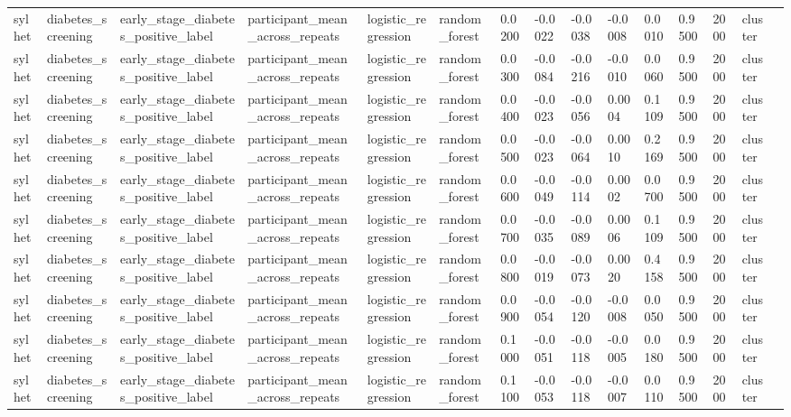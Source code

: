 \begin{tabular}{lllllllllllllll}
sylhet & diabetes\_screening & early\_stage\_diabetes\_positive\_label & participant\_mean\_across\_repeats & logistic\_regression & random\_forest & 0.0200 & -0.0022 & -0.0038 & -0.0008 & 0.0010 & 0.9500 & 2000 & cluster &  \\
sylhet & diabetes\_screening & early\_stage\_diabetes\_positive\_label & participant\_mean\_across\_repeats & logistic\_regression & random\_forest & 0.0300 & -0.0084 & -0.0216 & -0.0010 & 0.0060 & 0.9500 & 2000 & cluster &  \\
sylhet & diabetes\_screening & early\_stage\_diabetes\_positive\_label & participant\_mean\_across\_repeats & logistic\_regression & random\_forest & 0.0400 & -0.0023 & -0.0056 & 0.0004 & 0.1109 & 0.9500 & 2000 & cluster &  \\
sylhet & diabetes\_screening & early\_stage\_diabetes\_positive\_label & participant\_mean\_across\_repeats & logistic\_regression & random\_forest & 0.0500 & -0.0023 & -0.0064 & 0.0010 & 0.2169 & 0.9500 & 2000 & cluster &  \\
sylhet & diabetes\_screening & early\_stage\_diabetes\_positive\_label & participant\_mean\_across\_repeats & logistic\_regression & random\_forest & 0.0600 & -0.0049 & -0.0114 & 0.0002 & 0.0700 & 0.9500 & 2000 & cluster &  \\
sylhet & diabetes\_screening & early\_stage\_diabetes\_positive\_label & participant\_mean\_across\_repeats & logistic\_regression & random\_forest & 0.0700 & -0.0035 & -0.0089 & 0.0006 & 0.1109 & 0.9500 & 2000 & cluster &  \\
sylhet & diabetes\_screening & early\_stage\_diabetes\_positive\_label & participant\_mean\_across\_repeats & logistic\_regression & random\_forest & 0.0800 & -0.0019 & -0.0073 & 0.0020 & 0.4158 & 0.9500 & 2000 & cluster &  \\
sylhet & diabetes\_screening & early\_stage\_diabetes\_positive\_label & participant\_mean\_across\_repeats & logistic\_regression & random\_forest & 0.0900 & -0.0054 & -0.0120 & -0.0008 & 0.0050 & 0.9500 & 2000 & cluster &  \\
sylhet & diabetes\_screening & early\_stage\_diabetes\_positive\_label & participant\_mean\_across\_repeats & logistic\_regression & random\_forest & 0.1000 & -0.0051 & -0.0118 & -0.0005 & 0.0180 & 0.9500 & 2000 & cluster &  \\
sylhet & diabetes\_screening & early\_stage\_diabetes\_positive\_label & participant\_mean\_across\_repeats & logistic\_regression & random\_forest & 0.1100 & -0.0053 & -0.0118 & -0.0007 & 0.0110 & 0.9500 & 2000 & cluster &  \\

\end{tabular}
